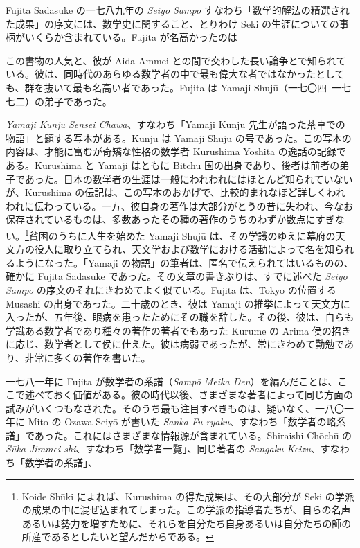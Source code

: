 \documentclass[11pt]{article}
\newcommand{\scanpage}[2]{\clearpage\setcounter{footnote}{0}\noindent{\footnotesize\color{gray}PDF #1 頁 · #2}\par\medskip}
\begin{document}
Fujita Sadasuke の一七八九年の \emph{Seiyō Sampō} すなわち「数学的解法の精選された成果」の序文には、数学史に関すること、とりわけ Seki の生涯についての事柄がいくらか含まれている。Fujita が名高かったのは

\scanpage{0338}{印刷頁 324 (top left)}
\noindent この書物の人気と、彼が Aida Ammei との間で交わした長い論争とで知られている。彼は、同時代のあらゆる数学者の中で最も偉大な者ではなかったとしても、群を抜いて最も名高い者であった。Fujita は Yamaji Shujū（一七〇四--一七七二）の弟子であった。

\emph{Yamaji Kunju Sensei Chawa}、すなわち「Yamaji Kunju 先生が語った茶卓での物語」と題する写本がある。Kunju は Yamaji Shujū の号であった。この写本の内容は、才能に富むが奇矯な性格の数学者 Kurushima Yoshita の逸話の記録である。Kurushima と Yamaji はともに Bitchū 国の出身であり、後者は前者の弟子であった。日本の数学者の生涯は一般にわれわれにはほとんど知られていないが、Kurushima の伝記は、この写本のおかげで、比較的まれなほど詳しくわれわれに伝わっている。一方、彼自身の著作は大部分がとうの昔に失われ、今なお保存されているものは、多数あったその種の著作のうちのわずか数点にすぎない。\footnote{Koide Shūki によれば、Kurushima の得た成果は、その大部分が Seki の学派の成果の中に混ぜ込まれてしまった。この学派の指導者たちが、自らの名声あるいは勢力を増すために、それらを自分たち自身あるいは自分たちの師の所産であるとしたいと望んだからである。}貧困のうちに人生を始めた Yamaji Shujū は、その学識のゆえに幕府の天文方の役人に取り立てられ、天文学および数学における活動によって名を知られるようになった。「Yamaji の物語」の筆者は、匿名で伝えられてはいるものの、確かに Fujita Sadasuke であった。その文章の書きぶりは、すでに述べた \emph{Seiyō Sampō} の序文のそれにきわめてよく似ている。Fujita は、Tokyo の位置する Musashi の出身であった。二十歳のとき、彼は Yamaji の推挙によって天文方に入ったが、五年後、眼病を患ったためにその職を辞した。その後、彼は、自らも学識ある数学者であり種々の著作の著者でもあった Kurume の Arima 侯の招きに応じ、数学者として侯に仕えた。彼は病弱であったが、常にきわめて勤勉であり、非常に多くの著作を書いた。

一七八一年に Fujita が数学者の系譜（\emph{Sampō Meika Den}）を編んだことは、ここで述べておく価値がある。彼の時代以後、さまざまな著者によって同じ方面の試みがいくつもなされた。そのうち最も注目すべきものは、疑いなく、一八〇一年に Mito の Ozawa Seiyō が書いた \emph{Sanka Fu-ryaku}、すなわち「数学者の略系譜」であった。これにはさまざまな情報源が含まれている。Shiraishi Chōchū の \emph{Sūka Jimmei-shi}、すなわち「数学者一覧」、同じ著者の \emph{Sangaku Keizu}、すなわち「数学者の系譜」、
\end{document}
